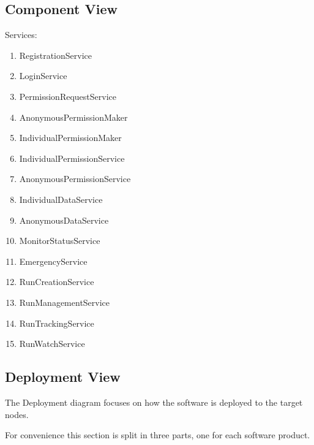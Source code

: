 \documentclass[a4paper]{article}
\begin{document}
\subsection{Component View}
Services:
\begin{enumerate}
    \item RegistrationService
    \item LoginService
    \item PermissionRequestService %
    \item AnonymousPermissionMaker
    \item IndividualPermissionMaker
    \item IndividualPermissionService %
    \item AnonymousPermissionService %
    \item IndividualDataService %
    \item AnonymousDataService %
    
    \item MonitorStatusService
    \item EmergencyService
    
    \item RunCreationService %
    \item RunManagementService %
    \item RunTrackingService %
    \item RunWatchService %
    
\end{enumerate}

\subsection{Deployment View}
The Deployment diagram focuses on how the software is deployed to the target nodes.

For convenience this section is split in three parts, one for each software product.
\end{document}
